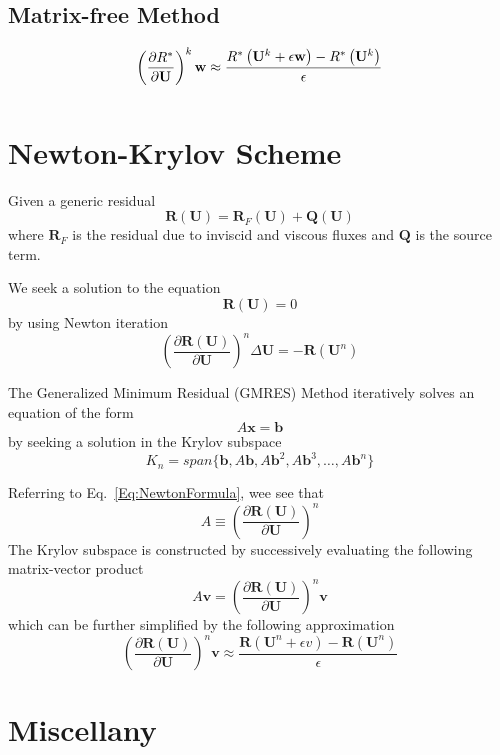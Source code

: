\documentclass[a4paper]{article}
\begin{document}
\subsection{Matrix-free Method}
\begin{equation}
\left(\frac{\partial R^*}{\partial\mathbf{U}}\right)^k \mathbf{w}
\approx
\frac{R^*\left(\mathbf{U}^k + \epsilon\mathbf{w}\right) - R^*\left(\mathbf{U}^k\right)}{\epsilon}
\end{equation}
\begin{equation}
\end{equation}

\section{Newton-Krylov Scheme}

Given a generic residual
\[
\mathbf{R}(\mathbf{U}) = \mathbf{R}_F(\mathbf{U}) + \mathbf{Q}(\mathbf{U})
\]
where $\mathbf{R}_F$ is the residual due to inviscid and viscous fluxes and $\mathbf{Q}$ is the source term.

We seek a solution to the equation
\[
\mathbf{R}(\mathbf{U}) = 0
\]
by using Newton iteration
\begin{equation}
\left(\frac{\partial\mathbf{R}(\mathbf{U})}{\partial\mathbf{U}}\right)^n \Delta\mathbf{U}
=
-\mathbf{R}(\mathbf{U}^n)
\label{Eq:NewtonFormula}
\end{equation}

The Generalized Minimum Residual (GMRES) Method iteratively solves an equation of the form
\[
A\mathbf{x} = \mathbf{b}
\]
by seeking a solution in the Krylov subspace
\[
K_n = span\{ \mathbf{b}, A\mathbf{b}, A\mathbf{b}^2, A\mathbf{b}^3, \ldots, A\mathbf{b}^n \}
\]

Referring to Eq.~\ref{Eq:NewtonFormula}, wee see that
\[
A \equiv \left(\frac{\partial\mathbf{R}(\mathbf{U})}{\partial\mathbf{U}}\right)^n
\]
The Krylov subspace is constructed by successively evaluating the following matrix-vector product
\[
A\mathbf{v} = 
\left(\frac{\partial\mathbf{R}(\mathbf{U})}{\partial\mathbf{U}}\right)^n \mathbf{v}
\]
which can be further simplified by the following approximation
\[
\left(\frac{\partial\mathbf{R}(\mathbf{U})}{\partial\mathbf{U}}\right)^n \mathbf{v}
\approx
\frac{
\mathbf{R}(\mathbf{U}^n + \epsilon v) - \mathbf{R}(\mathbf{U}^n)
}
{
\epsilon
}
\]

\section{Miscellany}
\end{document}
